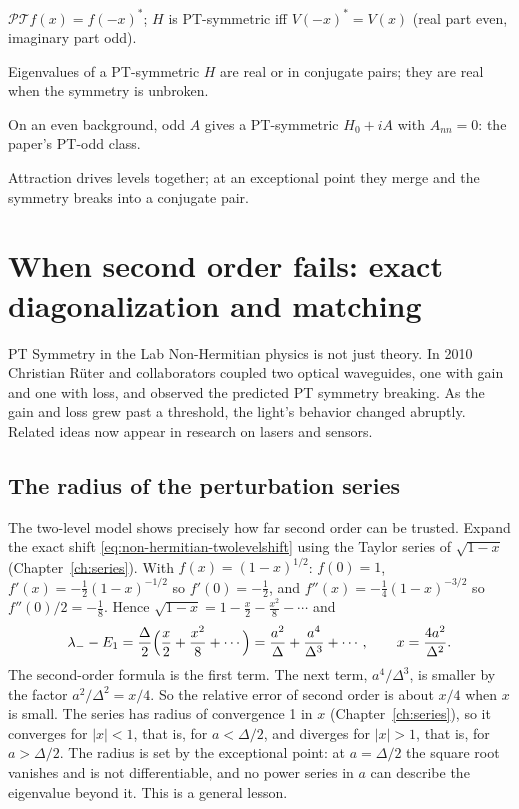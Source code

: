 \begin{keyideas}
\item $\mathcal{PT}f(x)=f(-x)^*$; $H$ is PT-symmetric iff $V(-x)^*=V(x)$ (real part even, imaginary part odd).
\item Eigenvalues of a PT-symmetric $H$ are real or in conjugate pairs; they are real when the symmetry is unbroken.
\item On an even background, odd $A$ gives a PT-symmetric $H_0+iA$ with $A_{nn}=0$: the paper's PT-odd class.
\item Attraction drives levels together; at an exceptional point they merge and the symmetry breaks into a conjugate pair.
\end{keyideas}

\section{When second order fails: exact diagonalization and matching}\label{sec:non-hermitian-exact}
\begin{didyouknow}{PT Symmetry in the Lab}
Non-Hermitian physics is not just theory. In 2010 Christian R\"uter and collaborators coupled two optical waveguides, one with gain and one with loss, and observed the predicted PT symmetry breaking. As the gain and loss grew past a threshold, the light's behavior changed abruptly. Related ideas now appear in research on lasers and sensors.
\end{didyouknow}

\subsection{The radius of the perturbation series}

The two-level model shows precisely how far second order can be trusted. Expand the exact shift \eqref{eq:non-hermitian-twolevelshift} using the Taylor series of $\sqrt{1-x}$ (Chapter~\ref{ch:series}). With $f(x)=(1-x)^{1/2}$: $f(0)=1$, $f'(x)=-\tfrac12(1-x)^{-1/2}$ so $f'(0)=-\tfrac12$, and $f''(x)=-\tfrac14(1-x)^{-3/2}$ so $f''(0)/2=-\tfrac18$. Hence $\sqrt{1-x}=1-\tfrac x2-\tfrac{x^2}{8}-\cdots$ and
\begin{equation}
\lambda_--E_1 = \frac\Delta2\Bigl(\frac x2+\frac{x^2}{8}+\cdots\Bigr) = \frac{a^2}{\Delta}+\frac{a^4}{\Delta^3}+\cdots,
\qquad x=\frac{4a^2}{\Delta^2}.
\label{eq:non-hermitian-series}
\end{equation}
The second-order formula is the first term. The next term, $a^4/\Delta^3$, is smaller by the factor $a^2/\Delta^2=x/4$. So the relative error of second order is about $x/4$ when $x$ is small. The series has radius of convergence 1 in $x$ (Chapter~\ref{ch:series}), so it converges for $|x|<1$, that is, for $a<\Delta/2$, and diverges for $|x|>1$, that is, for $a>\Delta/2$. The radius is set by the exceptional point: at $a=\Delta/2$ the square root vanishes and is not differentiable, and no power series in $a$ can describe the eigenvalue beyond it. This is a general lesson.

